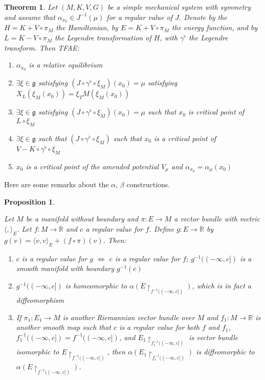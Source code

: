 \documentclass{article}
\newtheorem{thm}{Theorem}
\newtheorem{prop}{Proposition}
\begin{document}
\begin{thm}

Let $(M,K,V,G)$ be a simple mechanical system with symmetry and assume that $\alpha_{x_0} \in J^{-1}(\mu)$ for a regular value of $J$. Denote by the $H=K+V \circ \pi_M$ the Hamiltonian, by $E=K+V \circ \pi_M$ the energy function, and by $L=K-V \circ \pi_M$ the Legendre transformation of $H$, with $\gamma^{\flat}$ the Legendre transform. Then TFAE:

\begin{enumerate}
    \item $\alpha_{x_0}$ is a relative equilibrium
    \item $\exists \xi \in \mathfrak{g}$ satisfying $(J \circ \gamma^{\flat} \circ \xi_M)(x_0) = \mu$ satisfying $X_L(\xi_M(x_0))=\xi_TM(\xi_M(x_0))$
    \item $\exists \xi \in \mathfrak{g}$ satisfying $(J \circ \gamma^{\flat} \circ \xi_M)(x_0)=\mu$ such that $x_0$ is critical point of $L \circ \xi_M$
    \item $\exists \xi \in \mathfrak{g}$ such that $(J \circ \gamma^{\flat} \circ \xi_M)$ such that $x_0$ is a critical point of $V-K \circ \gamma^{\flat} \circ \xi_M$
    \item $x_0$ is a critical point of the amended potential $V_{\mu}$ and $\alpha_{x_0}=\alpha_{\mu}(x_0)$
\end{enumerate}
\end{thm}

Here are some remarks about the $\alpha$, $\beta$ constructions.

\begin{prop} \label{prop:1}

Let $M$ be a manifold without boundary and $\pi:E \to M$ a vector bundle with metric $\langle, \rangle_E$. Let $f:M \to \mathbb{R}$ and $c$ a regular value for $f$. Define $g: E \to \mathbb{R}$ by $g(v)=\langle v,v \rangle_E + (f \circ \pi)(v)$. Then:
\begin{enumerate}
    \item $c$ is a regular value for $g$ $\iff$ $c$ is a regular value for $f$; $g^{-1}((-\infty,c])$ is a smooth manifold with boundary $g^{-1}(c)$
    \item $g^{-1}((-\infty,c])$ is homeomorphic to $\alpha(E\restriction_{f^{-1}((-\infty,c])})$, which is in fact a diffeomorphism
    \item If $\pi_1:E_1 \to M$ is another Riemannian vector bundle over $M$ and $f_1:M \to \mathbb{R}$ is another smooth map such that $c$ is a regular value for both $f$ and $f_1$, $f^{-1}_1((-\infty,c])=f^{-1}((-\infty,c])$, and $E_1 \restriction_{f^{-1}_1((-\infty,c])} $ is vector bundle isomorphic to $E \restriction_{f^{-1}((-\infty,c])}$, then $\alpha(E_1 \restriction_{f^{-1}_1((-\infty,c])})$ is diffeomorphic to $\alpha(E \restriction_{f^{-1}((-\infty,c])})$.
\end{enumerate}
\end{prop}
\end{document}
